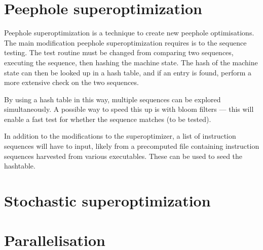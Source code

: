 \documentclass{article}
\begin{document}
\section{Peephole superoptimization}

Peephole superoptimization is a technique to create new peephole optimisations. The main modification peephole superoptimization requires is to the sequence testing. The test routine must be changed from comparing two sequences, executing the sequence, then hashing the machine state. The hash of the machine state can then be looked up in a hash table, and if an entry is found, perform a more extensive check on the two sequences.

By using a hash table in this way, multiple sequences can be explored simultaneously. A possible way to speed this up is with bloom filters --- this will enable a fast test for whether the sequence matches (to be tested).

In addition to the modifications to the superoptimizer, a list of instruction sequences will have to input, likely from a precomputed file containing instruction sequences harvested from various executables. These can be used to seed the hashtable.

\section{Stochastic superoptimization}
\section{Parallelisation}
\end{document}
